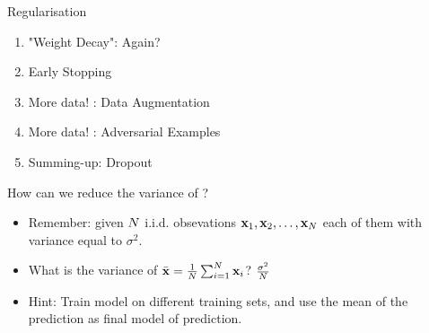 \documentclass[xcolor=pdftex,dvipsnames,table,mathserif]{beamer}
\begin{document}
\begin{frame}{Regularisation}
\begin{enumerate}
\item "Weight Decay": Again?
\item Early Stopping
\item More data! : Data Augmentation
\item More data!  : Adversarial Examples
\item Summing-up: Dropout
\end{enumerate}
\end{frame}

\begin{frame}{How can we reduce the variance of ?}
\begin{itemize}
\item Remember: given $N$ i.i.d. obsevations $\mathbf{x}_1,\mathbf{x}_2,\ldots,\mathbf{x}_N$ each of them with variance equal to $\sigma^2$. 
\item What is the variance of $\bar{\mathbf{x}}=\frac{1}{N} \sum_{i=1}^{N} \mathbf{x}_i $? \pause $\frac{\sigma^2}{N}$
\item Hint: Train model on different training sets, and use the mean of the prediction as final model of prediction.
\end{itemize}
\end{frame}
\end{document}
